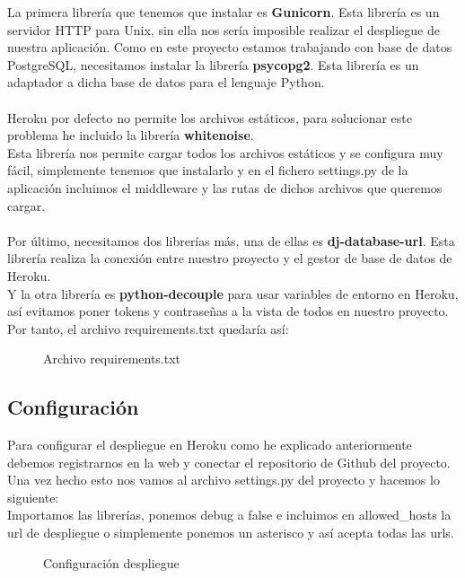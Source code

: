 La primera librería que tenemos que instalar es \textbf{Gunicorn}. Esta librería es un servidor HTTP para Unix, sin ella nos sería imposible realizar el despliegue de nuestra aplicación.
Como en este proyecto estamos trabajando con base de datos PostgreSQL, necesitamos instalar la librería \textbf{psycopg2}. Esta librería es un adaptador a dicha base de datos para el lenguaje Python.\\\\
Heroku por defecto no permite los archivos estáticos, para solucionar este problema he incluido la librería \textbf{whitenoise}.\\
Esta librería nos permite cargar todos los archivos estáticos y se configura muy fácil, simplemente tenemos que instalarlo y en
el fichero settings.py de la aplicación incluimos el middleware y las rutas de dichos archivos que queremos cargar.\\\\
Por último, necesitamos dos librerías más, una de ellas es \textbf{dj-database-url}. Esta librería realiza la conexión entre nuestro proyecto y el gestor de base de datos de Heroku.\\
Y la otra librería es \textbf{python-decouple} para usar variables de entorno en Heroku, así evitamos poner tokens y contraseñas a la vista de todos en nuestro proyecto. \\

Por tanto, el archivo requirements.txt quedaría así:
\begin{figure}[H]
  \centering
  \noindent{}
  \caption{Archivo requirements.txt}
\end{figure}


\subsection{Configuración}

Para configurar el despliegue en Heroku como he explicado anteriormente debemos registrarnos en la web y conectar el repositorio de Github del proyecto.
Una vez hecho esto nos vamos al archivo settings.py del proyecto y hacemos lo siguiente:\\
Importamos las librerías, ponemos debug a false e incluimos en allowed\_hosts la url de despliegue o simplemente ponemos un asterisco y así acepta todas las urls.

\begin{figure}[H]
  \centering
  \noindent{}
  \caption{Configuración despliegue}
\end{figure}

